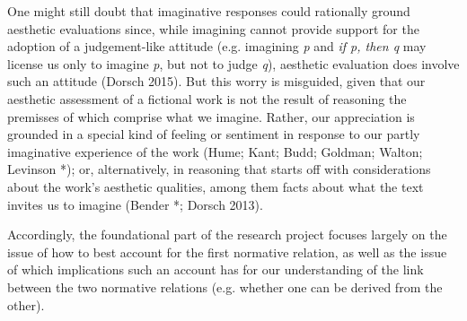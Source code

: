 One might still doubt that imaginative responses could rationally ground
aesthetic evaluations since, while imagining cannot provide support for
the adoption of a judgement-like attitude (e.g. imagining \emph{p} and \emph{if p, then q} may license us only to imagine \emph{p}, but not to judge \emph{q}), aesthetic evaluation does involve such an attitude (Dorsch 2015). But this worry is misguided, given that our aesthetic assessment of a fictional work is not the result of reasoning the premisses of which comprise what we imagine. Rather, our appreciation is grounded in a special kind of
feeling or sentiment in response to our partly imaginative experience of
the work (Hume; Kant; Budd; Goldman; Walton; Levinson *); or,
alternatively, in reasoning that starts off with considerations about
the work's aesthetic qualities, among them facts about what the text
invites us to imagine (Bender *; Dorsch 2013).

Accordingly, the foundational part of the research project focuses
largely on the issue of how to best account for the first normative
relation, as well as the issue of which implications such an account has
for our understanding of the link between the two normative relations
(e.g. whether one can be derived from the other).

